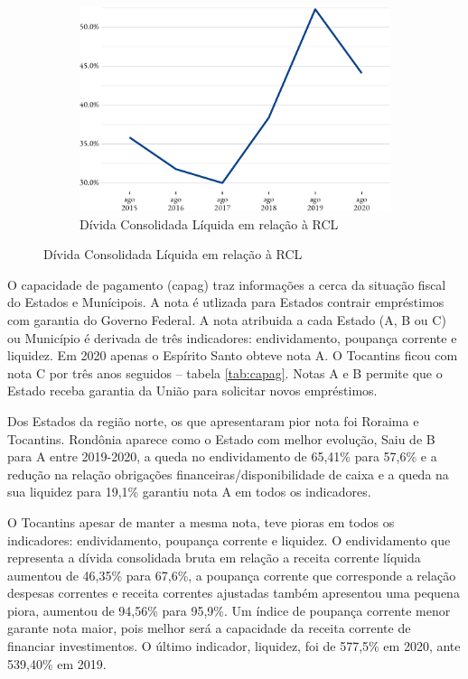 \begin{figure}[!h]
	\begin{subfigure}{\linewidth}
		\caption{\label{fig:}Dívida Consolidada Líquida em relação à RCL}
		\includegraphics{fig/divida_rcl-1.pdf}
	\end{subfigure}
\end{figure}

O capacidade de pagamento (\acrshort{capag}) traz informações a cerca da
situação fiscal do Estados e Munícipois. A nota é utlizada para Estados
contrair empréstimos com garantia do Governo Federal. A nota atribuida a
cada Estado (A, B ou C) ou Município é derivada de três indicadores:
endividamento, poupança corrente e liquidez. Em 2020 apenas o Espírito
Santo obteve nota A. O Tocantins ficou com nota C por três anos
seguidos -- tabela \ref{tab:capag}. Notas A e B permite que o Estado receba garantia da União para
solicitar novos empréstimos.

Dos Estados da região norte, os que apresentaram pior nota foi Roraima e
Tocantins. Rondônia aparece como o Estado com melhor evolução, Saiu de B
para A entre 2019-2020, a queda no endividamento de 65,41\% para 57,6\%
e a redução na relação obrigações financeiras/disponibilidade de caixa e
a queda na sua liquidez para 19,1\% garantiu nota A em todos os
indicadores.

O Tocantins apesar de manter a mesma nota, teve pioras em todos os
indicadores: endividamento, poupança corrente e liquidez. O
endividamento que representa a dívida consolidada bruta em relação a
receita corrente líquida aumentou de 46,35\% para 67,6\%, a poupança
corrente que corresponde a relação despesas correntes e receita
correntes ajustadas também apresentou uma pequena piora, aumentou de
94,56\% para 95,9\%. Um índice de poupança corrente menor garante nota
maior, pois melhor será a capacidade da receita corrente de financiar
investimentos. O último indicador, liquidez, foi de 577,5\% em 2020,
ante 539,40\% em 2019.

